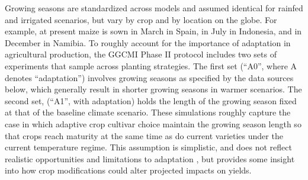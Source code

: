 \documentclass[gmd, manuscript]{copernicus} %
\begin{document}

Growing seasons are standardized across models and assumed identical for rainfed and irrigated scenarios, but vary by crop and by location on the globe. 
For example, at present maize is sown in March in Spain, in July in Indonesia, and in December in Namibia. 
To roughly account for the importance of adaptation in agricultural production, the GGCMI Phase II protocol includes two sets of experiments that sample across planting strategies. 
The first set (``A0'', where A denotes ``adaptation'') involves growing seasons as specified by the data sources below, which generally result in shorter growing seasons in warmer scenarios. 
The second set, (``A1'', with adaptation) holds the length of the growing season fixed at that of the baseline climate scenario. 
These simulations roughly capture the case in which adaptive crop cultivar choice maintain the growing season length so that crops reach maturity at the same time as do current varieties under the current temperature regime. 
This assumption is simplistic, and does not reflect realistic opportunities and limitations to adaptation \citep{vadez2012adaptation,challinor2018improving}, but provides some insight into how crop modifications could alter projected impacts on yields.
\end{document}
